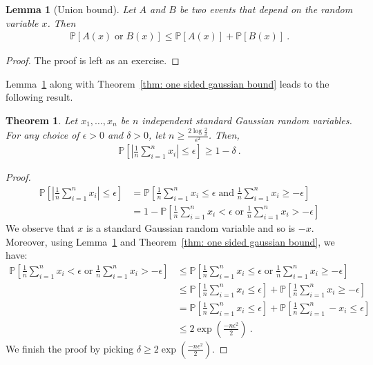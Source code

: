 \documentclass[11pt]{article}
\newtheorem{theorem}{Theorem}
\newtheorem{lemma}{Lemma}
\newcommand{\prob}[1]{\mathbb{P}\left[ #1 \right]}
\newcommand{\abs}[1]{\left| #1 \right|}
\begin{document}
\begin{lemma}[Union bound]
    \label{lem:union bound}
    Let $A$ and $B$ be two events that depend on the random variable $x$. Then
    \begin{align}
        \label{eq: union bound}
        \prob{A(x) \;\text{or}\; B(x) } \leq \prob{A(x)} + \prob{B(x)}~. 
    \end{align}
\end{lemma}
\begin{proof}
    The proof is left as an exercise.
\end{proof}
Lemma~\ref{lem:union bound} along with Theorem~\ref{thm: one sided gaussian bound} leads to the following result.
\begin{theorem}
    \label{thm: two sided gaussian bound}
    Let $x_1,\ldots,x_n$ be $n$ independent standard Gaussian random variables. For any choice of $\epsilon > 0$ and $\delta > 0$, let $n \geq \frac{2 \log \frac{2}{\delta}}{\epsilon^2}$. Then,
    \begin{align}
        \label{eq: two sided gaussian bound}
        \prob{\abs{\frac{1}{n} \sum_{i=1}^n x_i} \leq \epsilon} \geq 1 -  \delta~.
    \end{align}
\end{theorem}
\begin{proof}
    \begin{align}
        \prob{\abs{\frac{1}{n} \sum_{i=1}^n x_i} \leq \epsilon} &= \prob{ \frac{1}{n} \sum_{i=1}^n x_i \leq \epsilon \; \text{and}\; \frac{1}{n} \sum_{i=1}^n x_i \geq -\epsilon} \\
        &= 1 - \prob{ \frac{1}{n} \sum_{i=1}^n x_i < \epsilon \; \text{or}\; \frac{1}{n} \sum_{i=1}^n x_i > -\epsilon}
    \end{align}
    We observe that $x$ is a standard Gaussian random variable and so is $-x$. Moreover, using Lemma~\ref{lem:union bound} and Theorem~\ref{thm: one sided gaussian bound}, we have:
    \begin{align}
        \prob{ \frac{1}{n} \sum_{i=1}^n x_i < \epsilon \; \text{or}\; \frac{1}{n} \sum_{i=1}^n x_i > -\epsilon} &\leq \prob{ \frac{1}{n} \sum_{i=1}^n x_i \leq \epsilon \; \text{or}\; \frac{1}{n} \sum_{i=1}^n x_i \geq -\epsilon} \\
        &\leq \prob{ \frac{1}{n} \sum_{i=1}^n x_i \leq \epsilon}  + \prob{\frac{1}{n} \sum_{i=1}^n x_i \geq -\epsilon} \\
        &= \prob{ \frac{1}{n} \sum_{i=1}^n x_i \leq \epsilon}  + \prob{\frac{1}{n} \sum_{i=1}^n - x_i \leq \epsilon} \\
        &\leq 2 \exp\left(\frac{-n\epsilon^2}{2}\right)~.
    \end{align}
    We finish the proof by picking $\delta \geq 2 \exp\left(\frac{-n\epsilon^2}{2}\right)$.
\end{proof}
\end{document}
